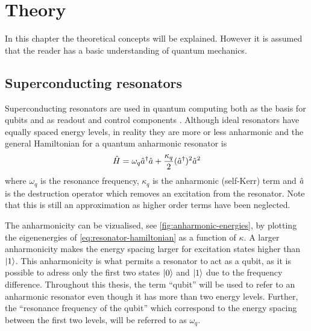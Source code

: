 \documentclass[main.tex]{subfiles}
\begin{document}
\chapter{Theory}
In this chapter the theoretical concepts will be explained.
However it is assumed that the reader has a basic understanding of quantum mechanics.

\section{Superconducting resonators}
Superconducting resonators are used in quantum computing both as the basis for qubits and as readout and control components \cite{}.
Although ideal resonators have equally spaced energy levels, in reality they are more or less anharmonic and the general Hamiltonian for a quantum anharmonic resonator is
\begin{equation}
    \hat{H} = \omega_{q} \hat{a}^\dagger\hat{a} + \frac{\kappa_q}{2} (\hat{a}^\dagger)^2\hat{a}^2
    \label{eq:resonator-hamiltonian}
\end{equation}
where \( \omega_{q} \) is the resonance frequency, \( \kappa_q \) is the anharmonic (self-Kerr) term and \(\hat{a}\) is the destruction operator which removes an excitation from the resonator.
Note that this is still an approximation as higher order terms have been neglected.

The anharmonicity can be vizualised, see \cref{fig:anharmonic-energies}, by plotting the eigenenergies of \cref{eq:resonator-hamiltonian} as a function of \( \kappa \).
A larger anharmonicity makes the energy spacing larger for excitation states higher than \(\ket{1}\).
This anharmonicity is what permits a resonator to act as a qubit, as it is possible to adress only the first two states \( \ket{0} \) and \( \ket{1} \) due to the frequency difference.
Throughout this thesis, the term ``qubit'' will be used to refer to an anharmonic resonator even though it has more than two energy levels.
Further, the ``resonance frequency of the qubit'' which correspond to the energy spacing between the first two levels, will be referred to as \( \omega_{q} \).

\end{document}
